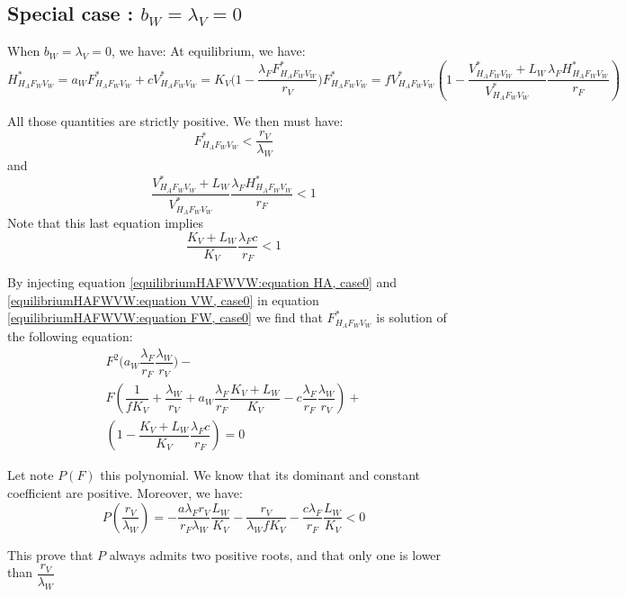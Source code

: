 \documentclass{article}
\newcommand{\lfw}{\lambda_{F}}
\newcommand{\lvw}{\lambda_{V}}
\newcommand{\lfv}{\lambda_{W}}
\begin{document}
\begin{appendices}
\subsection{Special case : $b_W = \lvw = 0$}
When $b_W = \lvw = 0$, we have:
At equilibrium, we have:
\begin{subequations}
\begin{equation}
H^*_{H_AF_WV_W} = a_W F^*_{H_AF_WV_W} + c
\label{equilibriumHAFWVW:equation HA, case0}
\end{equation}
\begin{equation}
V^*_{H_AF_WV_W} = K_V \Big(1 - \dfrac{\lfw F^*_{H_AF_WV_W}}{r_V} \Big)
\label{equilibriumHAFWVW:equation FW, case0}
\end{equation}
\begin{equation}
F^*_{H_AF_WV_W} = f V^*_{H_AF_WV_W} \left(1 - \dfrac{V^*_{H_AF_WV_W} + L_W}{V^*_{H_AF_WV_W} }\dfrac{\lfw H^*_{H_AF_WV_W}}{r_F} \right)
\label{equilibriumHAFWVW:equation VW, case0}
\end{equation}
\end{subequations}

All those quantities are strictly positive. We then must have:
$$
F^*_{H_AF_WV_W} < \dfrac{r_V}{\lfv}
$$
and
$$
\dfrac{V^*_{H_AF_WV_W} + L_W}{V^*_{H_AF_WV_W} }\dfrac{\lfw H^*_{H_AF_WV_W}}{r_F} < 1
$$
Note that this last equation implies 
$$
\dfrac{K_V + L_W}{K_V}\dfrac{\lfw c}{r_F} < 1
$$

By injecting equation \eqref{equilibriumHAFWVW:equation HA, case0} and \eqref{equilibriumHAFWVW:equation VW, case0} in equation \eqref{equilibriumHAFWVW:equation FW, case0}
we find that $F^*_{H_AF_WV_W}$ is solution of the following equation:
\begin{multline}
F^2 \Big(a_W\dfrac{\lfw}{r_F}\dfrac{\lfv}{r_V} \Big) - \\
F \left(\dfrac{1}{fK_V} + \dfrac{\lfv}{r_V} +  a_W \dfrac{\lfw}{r_F}\dfrac{K_V + L_W}{K_V} - c \dfrac{\lfw}{r_F} \dfrac{\lfv}{r_V}\right) + \\
\left(1 - \dfrac{K_V + L_W}{K_V} \dfrac{\lfw c}{r_F} \right) = 0
\label{equilibreHAFWVW:equationFW, case0}
\end{multline}

Let note $P(F)$ this polynomial. We know that its dominant and constant coefficient are positive. Moreover, we have:
\begin{equation*}
P(\dfrac{r_V}{\lfv}) = -\dfrac{a \lfw r_V}{r_F \lfv} \dfrac{L_W}{K_V} - \dfrac{r_V}{\lfv f K_V} - \dfrac{c \lfw}{r_F} \dfrac{L_W}{K_V} < 0
\end{equation*}

This prove that $P$ always admits two positive roots, and that only one is lower than $\dfrac{r_V}{\lfv}$


\end{appendices}
\end{document}
